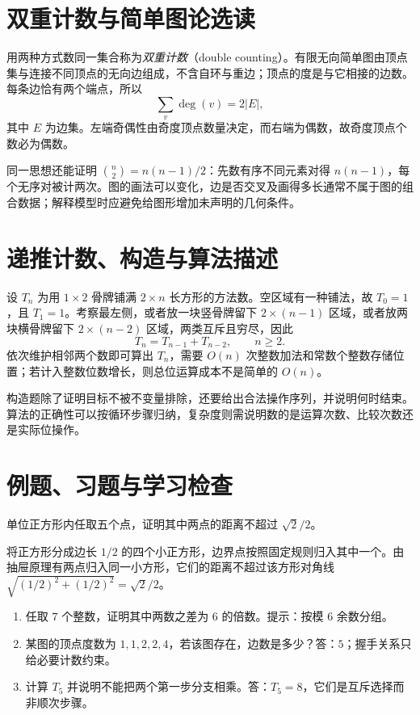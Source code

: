 \section{双重计数与简单图论选读}
用两种方式数同一集合称为\emph{双重计数}（double counting）。有限无向简单图由顶点集与连接不同顶点的无向边组成，不含自环与重边；顶点的度是与它相接的边数。每条边恰有两个端点，所以
\[
 \sum_{v}\deg(v)=2|E|,
\]
其中 $E$ 为边集。左端奇偶性由奇度顶点数量决定，而右端为偶数，故奇度顶点个数必为偶数。

同一思想还能证明 $\binom n2=n(n-1)/2$：先数有序不同元素对得 $n(n-1)$，每个无序对被计两次。图的画法可以变化，边是否交叉及画得多长通常不属于图的组合数据；解释模型时应避免给图形增加未声明的几何条件。

\section{递推计数、构造与算法描述}
设 $T_n$ 为用 $1\times2$ 骨牌铺满 $2\times n$ 长方形的方法数。空区域有一种铺法，故 $T_0=1$，且 $T_1=1$。考察最左侧，或者放一块竖骨牌留下 $2\times(n-1)$ 区域，或者放两块横骨牌留下 $2\times(n-2)$ 区域，两类互斥且穷尽，因此
\[
 T_n=T_{n-1}+T_{n-2},\qquad n\ge2.
\]
依次维护相邻两个数即可算出 $T_n$，需要 $O(n)$ 次整数加法和常数个整数存储位置；若计入整数位数增长，则总位运算成本不是简单的 $O(n)$。

构造题除了证明目标不被不变量排除，还要给出合法操作序列，并说明何时结束。算法的正确性可以按循环步骤归纳，复杂度则需说明数的是运算次数、比较次数还是实际位操作。

\section{例题、习题与学习检查}
\begin{example}
单位正方形内任取五个点，证明其中两点的距离不超过 $\sqrt2/2$。
\end{example}
\begin{solve}
将正方形分成边长 $1/2$ 的四个小正方形，边界点按照固定规则归入其中一个。由抽屉原理有两点归入同一小方形，它们的距离不超过该方形对角线 $\sqrt{(1/2)^2+(1/2)^2}=\sqrt2/2$。
\end{solve}
\begin{enumerate}
\item 任取 $7$ 个整数，证明其中两数之差为 $6$ 的倍数。提示：按模 $6$ 余数分组。
\item 某图的顶点度数为 $1,1,2,2,4$，若该图存在，边数是多少？答：$5$；握手关系只给必要计数约束。
\item 计算 $T_5$ 并说明不能把两个第一步分支相乘。答：$T_5=8$，它们是互斥选择而非顺次步骤。
\end{enumerate}

